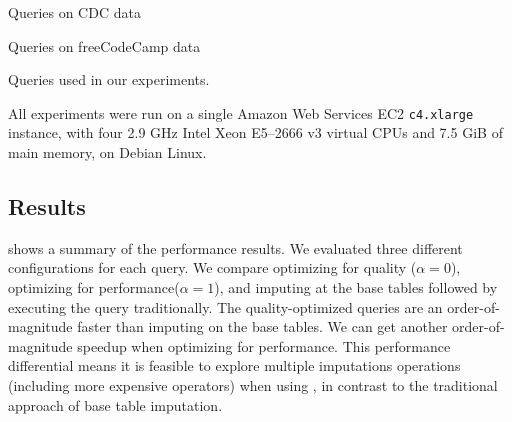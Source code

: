 \begin{table}
  \centering
  \begin{subtable}{\linewidth}
    
    \caption{Queries on CDC data}\label{fig:queries-cdc}
  \end{subtable}
  \par\medskip
  \begin{subtable}{\linewidth}
    
    \caption{Queries on freeCodeCamp data}\label{fig:queries-fcc}
  \end{subtable}
  \par\medskip
  \caption{Queries used in our experiments.}\label{fig:queries}
\end{table}

%  

All experiments were run on a single Amazon Web Services EC2 {\tt c4.xlarge} instance, with
four 2.9 GHz Intel Xeon E5--2666 v3 virtual CPUs and 7.5 GiB of main memory, on Debian Linux.

\subsection{Results}\label{sec:results}

 shows a summary of the performance results. We evaluated three different
configurations for each query. We compare \ProjectName{} optimizing for quality ($\alpha=0$),
\ProjectName{} optimizing for performance($\alpha=1$), and imputing at the base tables followed
by executing the query traditionally. The quality-optimized queries are an order-of-magnitude
faster than imputing on the base tables. We can get another order-of-magnitude speedup when
optimizing for performance. This performance differential means it is feasible
to explore multiple imputations operations (including more expensive operators) when using
\ProjectName{}, in contrast to the traditional approach of base table imputation.

